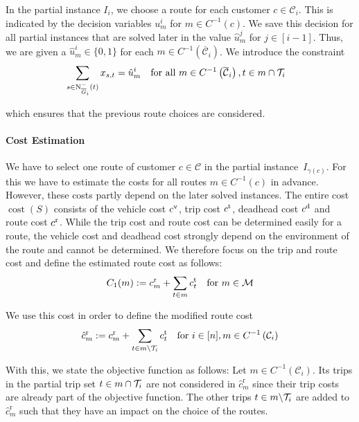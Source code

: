 In the partial instance $I_i$, we choose a route for each customer $c\in\mathcal{C}_i$. This is indicated by the decision variables $u^i_m$ for ${m\in C^{-1}(c)}$. We save this decision for all partial instances that are solved later in the value $\hat{u}^j_m$ for ${j\in[i-1]}$. Thus, we are given a ${\hat{u}^i_m\in\{0,1\}}$ for each ${m\in C^{-1}\left(\overline{\mathcal{C}}_i\right)}$. We introduce the constraint
\begin{align}
	&\sum_{s\in\operatorname{N}_{\overline{G}_i}^-(t)} x_{s,t} = \hat{u}^i_m && \text{for all } m\in C^{-1}\left(\overline{\mathcal{C}}_i\right), t\in m\cap\mathcal{T}_i \label{eq:TMILP:route_fix}
\end{align}

which ensures that the previous route choices are considered.

\paragraph{Cost Estimation} \parfill

We have to select one route of customer ${c\in\mathcal{C}}$ in the partial instance~$I_{\gamma(c)}$. For this we have to estimate the costs for all routes $m\in C^{-1}(c)$ in advance. However, these costs partly depend on the later solved instances. The entire cost $\operatorname{cost}(S)$ consists of the vehicle cost $c^{\operatorname{v}}$, trip cost $c^{\operatorname{t}}$, deadhead cost $c^{\operatorname{d}}$ and route cost $c^{\operatorname{r}}$. While the trip cost and route cost can be determined easily for a route, the vehicle cost and deadhead cost strongly depend on the environment of the route and cannot be determined. We therefore focus on the trip and route cost and define the estimated route cost as follows:
\begin{align*}
	C_1(m) := c^{\operatorname{r}}_m + \sum_{t\in m}c^{\operatorname{t}}_t && \text{for } m\in\mathcal{M}
\end{align*}

We use this cost in order to define the modified route cost
\begin{align*}
	\hat{c}^{\operatorname{r}}_m := c^{\operatorname{r}}_m + \sum_{t\in m\backslash\mathcal{T}_i}c^{\operatorname{t}}_t && \text{for } i\in[n], m\in C^{-1}\left(\mathcal{C}_i\right)
\end{align*}

With this, we state the objective function as follows: Let ${m\in C^{-1}\left(\mathcal{C}_i\right)}$. Its trips in the partial trip set ${t\in m\cap\mathcal{T}_i}$ are not considered in $\hat{c}^{\operatorname{r}}_m$ since their trip costs are already part of the objective function. The other trips ${t\in m\backslash\mathcal{T}_i}$ are added to $\hat{c}^{\operatorname{r}}_m$ such that they have an impact on the choice of the routes.

